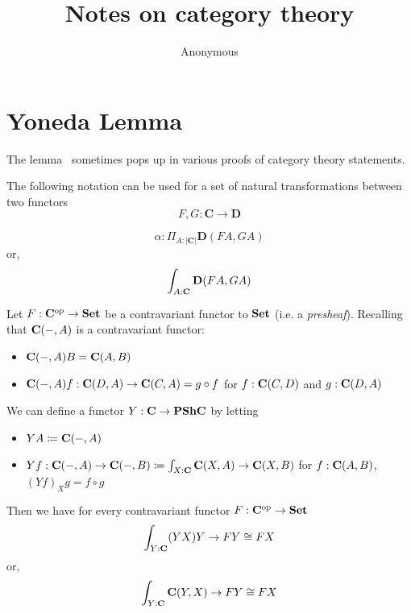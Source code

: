 \documentclass[acmsmall,screen, nonacm, anonymous]{acmart}
\begin{document}
\title{Notes on category theory}

\author{Anonymous}


\maketitle

\section{Yoneda Lemma}

The lemma~\cite{maclane} sometimes pops up in various proofs of category theory statements.

\begin{remark}

The following notation can be used for a set of natural transformations between two functors
\[
F,G : \mathbf{C} \to \mathbf{D}
\]

\[
\alpha : \Pi_{A : |\mathbf{C}|} \mathbf{D}(FA,GA)
\]
or,
\[
\int_{A : \mathbf{C}} \mathbf{D}(FA,GA)
\]

\end{remark}

\begin{lemma}[Yoneda]

Let $F : \mathbf{C}^{\text{op}} \to \mathbf{Set}$ be a contravariant functor to $\mathbf{Set}$ (i.e. a \textit{presheaf}).
Recalling that $\mathbf{C}(-, A)$ is a contravariant functor:
\begin{itemize}
\item $\mathbf{C}(-,A)B = \mathbf{C}(A,B)$
\item $\mathbf{C}(-,A)f : \mathbf{C}(D,A) \to \mathbf{C}(C,A) = g \circ f$ for $f : \mathbf{C}(C,D)$ and $g : \mathbf{C}(D,A)$
\end{itemize}

We can define a functor $Y : \mathbf{C} \to \mathbf{PShC}$ by letting
\begin{itemize}
\item $YA \coloneq \mathbf{C}(-,A)$
\item $Yf : \mathbf{C}(-,A) \to \mathbf{C}(-,B) \coloneq \int_{X : \mathbf{C}}\mathbf{C}(X,A) \to \mathbf{C}(X,B)$ for $f : \mathbf{C}(A,B)$, $(Yf)_{X}g = f \circ g$
\end{itemize}

Then we have for every contravariant functor $F : \mathbf{C}^{\text{op}} \to \mathbf{Set}$
\[
\int_{Y : \mathbf{C}}(YX)Y \to FY \cong FX
\]
or,
\[
\int_{Y : \mathbf{C}}\mathbf{C}(Y,X) \to FY \cong FX
\]
\end{lemma}
\end{document}
